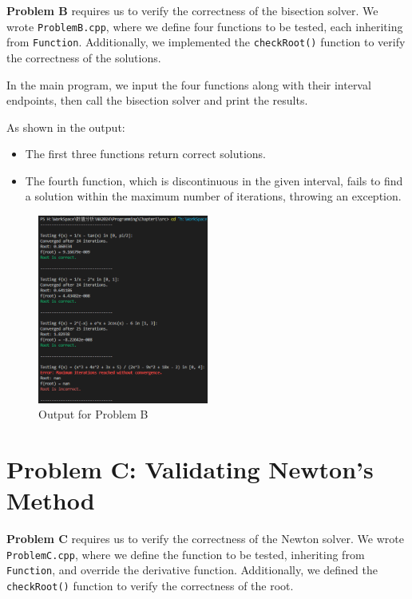 \documentclass[a4paper]{article}
\begin{document}
\textbf{Problem B} requires us to verify the correctness of the bisection solver. We wrote \texttt{ProblemB.cpp}, where we define four functions to be tested, each inheriting from \texttt{Function}. Additionally, we implemented the \texttt{checkRoot()} function to verify the correctness of the solutions. 

In the main program, we input the four functions along with their interval endpoints, then call the bisection solver and print the results. 

As shown in the output:
\begin{itemize}
    \item The first three functions return correct solutions.
    \item The fourth function, which is discontinuous in the given interval, fails to find a solution within the maximum number of iterations, throwing an exception.
\end{itemize}

\begin{figure}[H]  %
  \centering
  \includegraphics[width=0.5\textwidth]{./picture/ProblemB.png}
  \caption{Output for Problem B}
\end{figure}

\section{Problem C: Validating Newton's Method}

\textbf{Problem C} requires us to verify the correctness of the Newton solver. We wrote \texttt{ProblemC.cpp}, where we define the function to be tested, inheriting from \texttt{Function}, and override the derivative function. Additionally, we defined the \texttt{checkRoot()} function to verify the correctness of the root.
\end{document}
